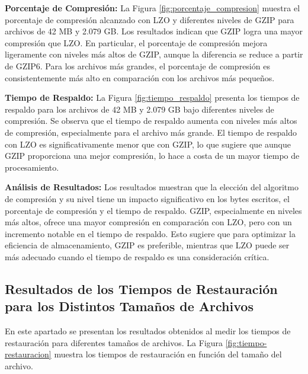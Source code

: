 \textbf{Porcentaje de Compresión:}
La Figura \ref{fig:porcentaje_compresion} muestra el porcentaje de compresión alcanzado con LZO y diferentes niveles de GZIP para archivos de 42 MB y 2.079 GB. Los resultados indican que GZIP logra una mayor compresión que LZO. En particular, el porcentaje de compresión mejora ligeramente con niveles más altos de GZIP, aunque la diferencia se reduce a partir de GZIP6. Para los archivos más grandes, el porcentaje de compresión es consistentemente más alto en comparación con los archivos más pequeños.

\textbf{Tiempo de Respaldo:}
La Figura \ref{fig:tiempo_respaldo} presenta los tiempos de respaldo para los archivos de 42 MB y 2.079 GB bajo diferentes niveles de compresión. Se observa que el tiempo de respaldo aumenta con niveles más altos de compresión, especialmente para el archivo más grande. El tiempo de respaldo con LZO es significativamente menor que con GZIP, lo que sugiere que aunque GZIP proporciona una mejor compresión, lo hace a costa de un mayor tiempo de procesamiento.

\textbf{Análisis de Resultados:}
Los resultados muestran que la elección del algoritmo de compresión y su nivel tiene un impacto significativo en los bytes escritos, el porcentaje de compresión y el tiempo de respaldo. GZIP, especialmente en niveles más altos, ofrece una mayor compresión en comparación con LZO, pero con un incremento notable en el tiempo de respaldo. Esto sugiere que para optimizar la eficiencia de almacenamiento, GZIP es preferible, mientras que LZO puede ser más adecuado cuando el tiempo de respaldo es una consideración crítica.




\subsection{Resultados de los Tiempos de Restauración para los Distintos Tamaños de Archivos}

En este apartado se presentan los resultados obtenidos al medir los tiempos de restauración para diferentes tamaños de archivos. La Figura \ref{fig:tiempo-restauracion} muestra los tiempos de restauración en función del tamaño del archivo.

